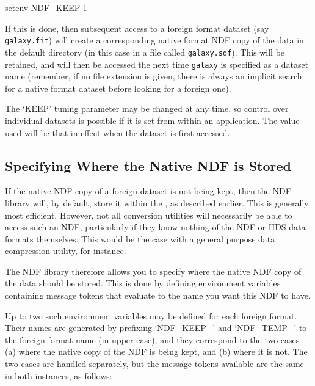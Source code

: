 \documentclass[11pt,twoside,nolof]{starlink}
\providecommand{\file}[1]{{\tt{#1}}}
\begin{document}
\begin{terminalv}
setenv NDF_KEEP 1
\end{terminalv}

If this is done, then subsequent access to a foreign format dataset
(say \file{galaxy.fit}) will create a corresponding native format NDF
copy of the data in the default directory (in this case in a file
called \file{galaxy.sdf}). This will be retained, and will then be
accessed the next time \file{galaxy} is specified as a dataset name
(remember, if no file extension is given, there is always an implicit
search for a native format dataset before looking for a foreign one).

The `KEEP' tuning parameter may be changed at any time, so control
over individual datasets is possible if it is set from within an
application. The value used will be that in effect when the dataset is
first accessed.

\subsection{\label{sect:whichndf}Specifying Where the Native NDF is Stored}

If the native NDF copy of a foreign dataset is not being kept, then
the NDF library will, by default, store it within the
 , as
described earlier. This is generally most efficient. However, not all
conversion utilities will necessarily be able to access such an NDF,
particularly if they know nothing of the NDF or HDS data formats
themselves. This would be the case with a general purpose data
compression utility, for instance.

The NDF library therefore allows you to specify where the native NDF
copy of the data should be stored. This is done by defining
environment variables containing message tokens that evaluate to the
name you want this NDF to have.

Up to two such environment variables may be defined for each foreign
format. Their names are generated by prefixing `NDF\_KEEP\_' and
`NDF\_TEMP\_' to the foreign format name (in upper case), and they
correspond to the two cases (a) where the native copy of the NDF is
being kept, and (b) where it is not. The two cases are handled
separately, but the message tokens available are the same in both
instances, as follows:
\end{document}
